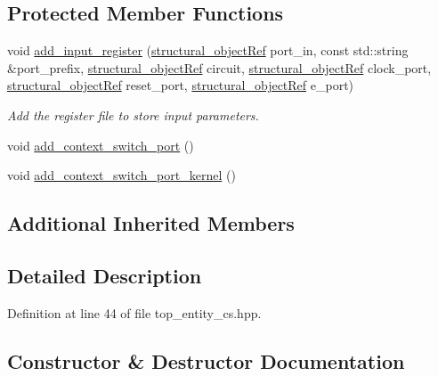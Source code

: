 \subsection*{Protected Member Functions}
\begin{DoxyCompactItemize}
\item 
void \hyperlink{classtop__entity__cs_a290fda5dd0c19322fd858606b5706aec}{add\+\_\+input\+\_\+register} (\hyperlink{structural__objects_8hpp_a8ea5f8cc50ab8f4c31e2751074ff60b2}{structural\+\_\+object\+Ref} port\+\_\+in, const std\+::string \&port\+\_\+prefix, \hyperlink{structural__objects_8hpp_a8ea5f8cc50ab8f4c31e2751074ff60b2}{structural\+\_\+object\+Ref} circuit, \hyperlink{structural__objects_8hpp_a8ea5f8cc50ab8f4c31e2751074ff60b2}{structural\+\_\+object\+Ref} clock\+\_\+port, \hyperlink{structural__objects_8hpp_a8ea5f8cc50ab8f4c31e2751074ff60b2}{structural\+\_\+object\+Ref} reset\+\_\+port, \hyperlink{structural__objects_8hpp_a8ea5f8cc50ab8f4c31e2751074ff60b2}{structural\+\_\+object\+Ref} e\+\_\+port)
\begin{DoxyCompactList}\small\item\em Add the register file to store input parameters. \end{DoxyCompactList}\item 
void \hyperlink{classtop__entity__cs_a4c457699245092dbe20fe8f2cb1e223d}{add\+\_\+context\+\_\+switch\+\_\+port} ()
\item 
void \hyperlink{classtop__entity__cs_a19522f640bbc667757f9ad40166e879f}{add\+\_\+context\+\_\+switch\+\_\+port\+\_\+kernel} ()
\end{DoxyCompactItemize}
\subsection*{Additional Inherited Members}


\subsection{Detailed Description}


Definition at line 44 of file top\+\_\+entity\+\_\+cs.\+hpp.



\subsection{Constructor \& Destructor Documentation}
\mbox{\label{classtop__entity__cs_a9df8ecca83132db26a9c1d297d07254b}} 
